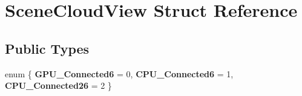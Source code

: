 \hypertarget{struct_scene_cloud_view}{\section{Scene\+Cloud\+View Struct Reference}
\label{struct_scene_cloud_view}
}
\subsection*{Public Types}
\begin{DoxyCompactItemize}
\item 
\hypertarget{struct_scene_cloud_view_a0296162bfcc96b5b8af6b4dd11cf5b34}{enum \{ {\bfseries G\+P\+U\+\_\+\+Connected6} = 0, 
{\bfseries C\+P\+U\+\_\+\+Connected6} = 1, 
{\bfseries C\+P\+U\+\_\+\+Connected26} = 2
 \}}\label{struct_scene_cloud_view_a0296162bfcc96b5b8af6b4dd11cf5b34}

\end{DoxyCompactItemize}
